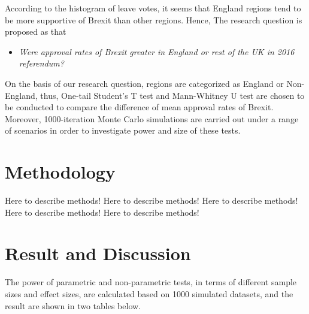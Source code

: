 \documentclass[]{article}
\providecommand{\tightlist}{%
  \setlength{\itemsep}{0pt}\setlength{\parskip}{0pt}}
\begin{document}
According to the histogram of leave votes, it seems that England regions
tend to be more supportive of Brexit than other regions. Hence, The
research question is proposed as that

\begin{itemize}
\tightlist
\item
  \emph{Were approval rates of Brexit greater in England or rest of the
  UK in 2016 referendum?}
\end{itemize}

On the basis of our research question, regions are categorized as
England or Non-England, thus, One-tail Student's T test and Mann-Whitney
U test are chosen to be conducted to compare the difference of mean
approval rates of Brexit. Moreover, 1000-iteration Monte Carlo
simulations are carried out under a range of scenarios in order to
investigate power and size of these tests.

\hypertarget{methodology}{%
\section{Methodology}\label{methodology}}

Here to describe methods! Here to describe methods! Here to describe
methods! Here to describe methods! Here to describe methods!

\hypertarget{result-and-discussion}{%
\section{Result and Discussion}\label{result-and-discussion}}

The power of parametric and non-parametric tests, in terms of different
sample sizes and effect sizes, are calculated based on 1000 simulated
datasets, and the result are shown in two tables below.
\end{document}
